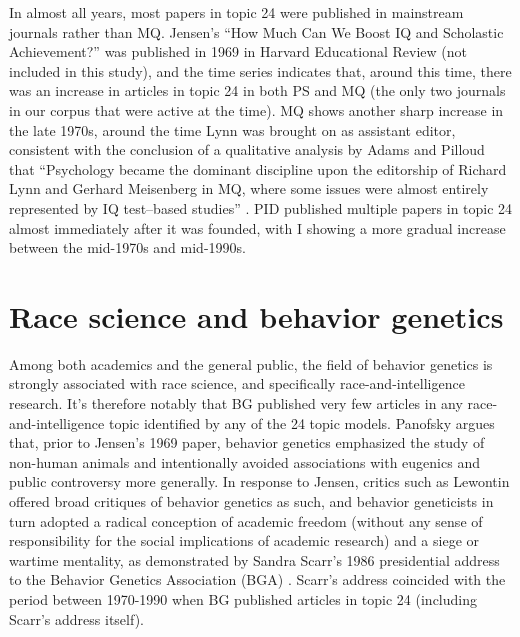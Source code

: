 \documentclass[12pt]{article}
\begin{document}
In almost all years, most papers in topic 24 were published in mainstream journals rather than MQ. Jensen's ``How Much Can We Boost IQ and Scholastic Achievement?'' \cite{JensenHowMuchCan1969} was published in 1969 in Harvard Educational Review (not included in this study), and the time series indicates that, around this time, there was an increase in articles in topic 24 in both PS and MQ (the only two journals in our corpus that were active at the time). MQ shows another sharp increase in the late 1970s, around the time Lynn was brought on as assistant editor, consistent with the conclusion of a qualitative analysis by Adams and Pilloud that ``Psychology became the dominant discipline upon the editorship of Richard Lynn and Gerhard Meisenberg in MQ, where some issues were almost entirely represented by IQ test--based studies'' \cite[110]{AdamsMisAppropriationBiological2021}. PID published multiple papers in topic 24 almost immediately after it was founded, with I showing a more gradual increase between the mid-1970s and mid-1990s.

\hypertarget{race-science-and-behavior-genetics}{%
\section*{Race science and behavior genetics}\label{race-science-and-behavior-genetics}}

Among both academics and the general public, the field of behavior genetics is strongly associated with race science, and specifically race-and-intelligence research. It's therefore notably that BG published very few articles in any race-and-intelligence topic identified by any of the 24 topic models. Panofsky \cite{PanofskyMisbehavingScienceControversy2014} argues that, prior to Jensen's 1969 paper, behavior genetics emphasized the study of non-human animals and intentionally avoided associations with eugenics and public controversy more generally. In response to Jensen, critics such as Lewontin offered broad critiques of behavior genetics as such, and behavior geneticists in turn adopted a radical conception of academic freedom (without any sense of responsibility for the social implications of academic research) and a siege or wartime mentality, as demonstrated by Sandra Scarr's 1986 presidential address to the Behavior Genetics Association (BGA) \cite{ScarrThreeCheersBehavior1987}. Scarr's address coincided with the period between 1970-1990 when BG published articles in topic 24 (including Scarr's address itself).
\end{document}
